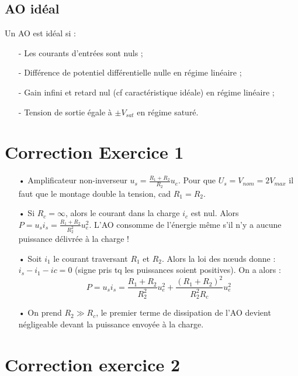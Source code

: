 \documentclass{report}
\begin{document}
\subsection*{AO idéal}

Un AO est idéal si : 
\begin{itemize}
	\item[-] Les courants d'entrées sont nuls ;
	\item[-] Différence de potentiel différentielle nulle en régime linéaire ;
	\item[-] Gain infini et retard nul (cf caractéristique idéale) en régime linéaire ;
	\item[-] Tension de sortie égale à $\pm V_{sat}$ en régime saturé.
	 
\end{itemize}


\section*{Correction Exercice 1}

\begin{itemize}
	\item[•] Amplificateur non-inverseur $u_s = \frac{R_1+R_2}{R_2}u_e$. Pour que $U_s = V_{nom}=2V_{max}$ il faut que le montage double la tension, cad $R_1=R_2$.
	\item[•]  Si $R_c=\infty$, alors le courant dans la charge $i_c$ est nul. Alors $P=u_si_s= \frac{R_1+R_2}{R_2^2}u_e^2$. L'AO consomme de l'énergie même s'il n'y a aucune puissance délivrée à la charge !
	\item[•] Soit $i_1$ le courant traversant $R_1$ et $R_2$. Alors la loi des nœuds donne : $i_s-i_1-ic=0$ (signe pris tq les puissances soient positives). On a alors :
	\begin{equation}
		P=u_si_s=\frac{R_1+R_2}{R_2^2}u_e^2+\frac{(R_1+R_2)^2}{R_2^2R_c}u_e^2
	\end{equation}
	\item[•] On prend $R_2\gg R_c$, le premier terme de dissipation de l'AO devient négligeable devant la puissance envoyée à la charge.
\end{itemize}

\section*{Correction exercice 2}
\end{document}
